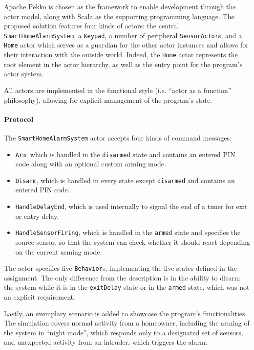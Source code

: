 \documentclass{scrartcl}
\begin{document}
Apache Pekko is chosen as the framework to enable development through the actor model, along with Scala as the supporting programming language. The proposed solution features four kinds of actors: the central \texttt{SmartHomeAlarmSystem}, a \texttt{Keypad}, a number of peripheral \texttt{SensorActor}s, and a \texttt{Home} actor which serves as a guardian for the other actor instances and allows for their interaction with the outside world. Indeed, the \texttt{Home} actor represents the root element in the actor hierarchy, as well as the entry point for the program's actor system.

All actors are implemented in the functional style (i.e. ``actor as a function'' philosophy), allowing for explicit management of the program's state.

\paragraph{Protocol} The \texttt{SmartHomeAlarmSystem} actor accepts four kinds of command messages:
\begin{itemize}
\item \texttt{Arm}, which is handled in the \texttt{disarmed} state and contains an entered PIN code along with an optional custom arming mode.
\item \texttt{Disarm}, which is handled in every state except \texttt{disarmed} and contains an entered PIN code.
\item \texttt{HandleDelayEnd}, which is used internally to signal the end of a timer for exit or entry delay.
\item \texttt{HandleSensorFiring}, which is handled in the \texttt{armed} state and specifies the source sensor, so that the system can check whether it should react depending on the current arming mode.
\end{itemize}

The actor specifies five \texttt{Behavior}s, implementing the five states defined in the assignment. The only difference from the description is in the ability to disarm the system while it is in the \texttt{exitDelay} state or in the \texttt{armed} state, which was not an explicit requirement.

Lastly, an exemplary scenario is added to showcase the program's functionalities. The simulation covers normal activity from a homeowner, including the arming of the system in ``night mode'', which responds only to a designated set of sensors, and unexpected activity from an intruder, which triggers the alarm.
\end{document}
